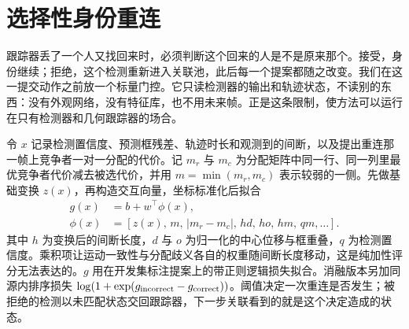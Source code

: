 \section{选择性身份重连}

跟踪器丢了一个人又找回来时，必须判断这个回来的人是不是原来那个。接受，身份继续；拒绝，这个检测重新进入关联池，此后每一个提案都随之改变。我们在这一提交动作之前放一个标量门控。它只读检测器的输出和轨迹状态，不读别的东西：没有外观网络，没有特征库，也不用未来帧。正是这条限制，使方法可以运行在只有检测器和几何跟踪器的场合。

令 $x$ 记录检测置信度、预测框残差、轨迹时长和观测到的间断，以及提出重连那一帧上竞争者一对一分配的代价。记 $m_r$ 与 $m_c$ 为分配矩阵中同一行、同一列里最优竞争者代价减去被选代价，并用 $m=\min(m_r,m_c)$ 表示较弱的一侧。先做基础变换 $z(x)$，再构造交互向量，坐标标准化后拟合
\begin{align*}
g(x) &= b+w^\top \phi(x),\\
\phi(x) &= [z(x),\,m,\,|m_r-m_c|,\,h d,\,h o,\,h m,\,q m,\ldots].
\end{align*}
其中 $h$ 为变换后的间断长度，$d$ 与 $o$ 为归一化的中心位移与框重叠，$q$ 为检测置信度。乘积项让运动一致性与分配歧义各自的权重随间断长度移动，这是纯加性评分无法表达的。$g$ 用在开发集标注提案上的带正则逻辑损失拟合。消融版本另加同源内排序损失
$\log(1+\exp(g_{\rm incorrect}-g_{\rm correct}))$。阈值决定一次重连是否发生；被拒绝的检测以未匹配状态交回跟踪器，下一步关联看到的就是这个决定造成的状态。

